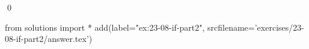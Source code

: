 
\begin{ex}
  \label{ex:23-08-if-part2}
  
  \qed
\end{ex}
\begin{python0}
from solutions import *
add(label="ex:23-08-if-part2",
    srcfilename='exercises/23-08-if-part2/answer.tex')
\end{python0}
